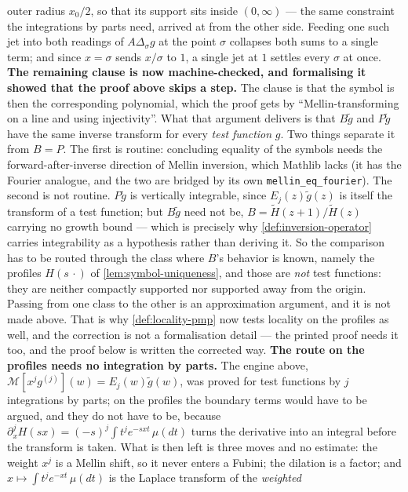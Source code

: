 \begin{lemma}[covariant local = polynomial symbol]
{outer radius $x_0/2$, so that its support sits inside $(0,\infty)$ --- the same constraint the
integrations by parts need, arrived at from the other side. Feeding one such jet into both
readings of $A\Delta_\sigma g$ at the point $\sigma$ collapses both sums to a single term; and
since $x = \sigma$ sends $x/\sigma$ to $1$, a single jet at $1$ settles every $\sigma$ at once.
\textbf{The remaining clause is now machine-checked, and formalising it showed that the proof
above skips a step.} The clause is that the symbol is then the corresponding polynomial, which
the proof gets by ``Mellin-transforming on a line and using injectivity''. What that argument
delivers is that $B\tilde g$ and $P\tilde g$ have the same inverse transform for every
\emph{test function} $g$. Two things separate it from $B = P$. The first is routine: concluding
equality of the symbols needs the forward-after-inverse direction of Mellin inversion, which
Mathlib lacks (it has the Fourier analogue, and the two are bridged by its own
\texttt{mellin\_eq\_fourier}). The second is not routine. $P\tilde g$ is vertically integrable,
since $E_j(z)\tilde g(z)$ is itself the transform of a test function; but $B\tilde g$ need not be,
$B = \tilde H(z{+}1)/\tilde H(z)$ carrying no growth bound --- which is precisely why
\ref{def:inversion-operator} carries integrability as a hypothesis rather than deriving it. So the
comparison has to be routed through the class where $B$'s behavior is known, namely the profiles
$H(s\,\cdot)$ of \ref{lem:symbol-uniqueness}, and those are \emph{not} test functions: they are
neither compactly supported nor supported away from the origin. Passing from one class to the
other is an approximation argument, and it is not made above. That is why \ref{def:locality-pmp}
now tests locality on the profiles as well, and the correction is not a formalisation detail ---
the printed proof needs it too, and the proof below is written the corrected way.
\textbf{The route on the profiles needs no integration by parts.} The engine above,
$\mathcal{M}[x^j g^{(j)}](w) = E_j(w)\tilde g(w)$, was proved for test functions by $j$
integrations by parts; on the profiles the boundary terms would have to be argued, and they do
not have to be, because $\partial_x^j H(sx) = (-s)^j\int t^j e^{-sxt}\,\mu(dt)$ turns the
derivative into an integral before the transform is taken. What is then left is three moves and
no estimate: the weight $x^j$ is a Mellin shift, so it never enters a Fubini; the dilation is a
factor; and $x \mapsto \int t^j e^{-xt}\,\mu(dt)$ is the Laplace transform of the \emph{weighted}
}
\end{lemma}

